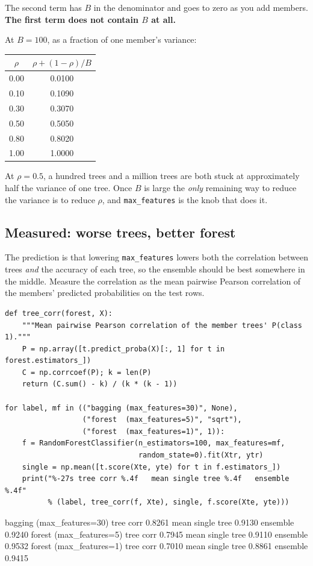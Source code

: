 \documentclass[11pt]{article}
\begin{document}
\begin{worked}
The second term has $B$ in the denominator and goes to zero as you add
members. \textbf{The first term does not contain $B$ at all.}

At $B = 100$, as a fraction of one member's variance:
\begin{center}
\begin{tabular}{cc}
  \toprule
  $\rho$ & $\rho + (1-\rho)/B$ \\
  \midrule
  0.00 & 0.0100 \\
  0.10 & 0.1090 \\
  0.30 & 0.3070 \\
  0.50 & 0.5050 \\
  0.80 & 0.8020 \\
  1.00 & 1.0000 \\
  \bottomrule
\end{tabular}
\end{center}
At $\rho = 0.5$, a hundred trees and a million trees are both stuck at
approximately half the variance of one tree. Once $B$ is large the
\emph{only} remaining way to reduce the variance is to reduce $\rho$, and
\texttt{max\_features} is the knob that does it.
\end{worked}

\subsection{Measured: worse trees, better forest}

The prediction is that lowering \texttt{max\_features} lowers both the
correlation between trees \emph{and} the accuracy of each tree, so the
ensemble should be best somewhere in the middle. Measure the correlation as
the mean pairwise Pearson correlation of the members' predicted probabilities
on the test rows.

\begin{lstlisting}
def tree_corr(forest, X):
    """Mean pairwise Pearson correlation of the member trees' P(class 1)."""
    P = np.array([t.predict_proba(X)[:, 1] for t in forest.estimators_])
    C = np.corrcoef(P); k = len(P)
    return (C.sum() - k) / (k * (k - 1))

for label, mf in (("bagging (max_features=30)", None),
                  ("forest  (max_features=5)", "sqrt"),
                  ("forest  (max_features=1)", 1)):
    f = RandomForestClassifier(n_estimators=100, max_features=mf,
                               random_state=0).fit(Xtr, ytr)
    single = np.mean([t.score(Xte, yte) for t in f.estimators_])
    print("%-27s tree corr %.4f   mean single tree %.4f   ensemble %.4f"
          % (label, tree_corr(f, Xte), single, f.score(Xte, yte)))
\end{lstlisting}
\begin{codeout}
bagging (max_features=30)   tree corr 0.8261   mean single tree 0.9130   ensemble 0.9240
forest  (max_features=5)    tree corr 0.7945   mean single tree 0.9110   ensemble 0.9532
forest  (max_features=1)    tree corr 0.7010   mean single tree 0.8861   ensemble 0.9415
\end{codeout}
\end{document}
